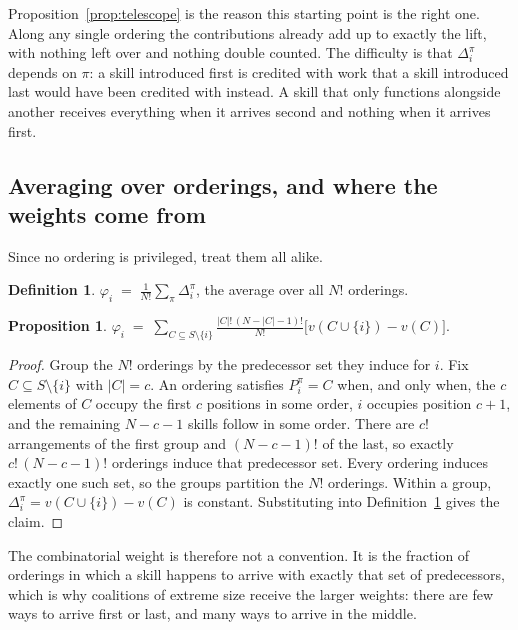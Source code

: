 \documentclass[11pt]{article}
\theoremstyle{plain}
\newtheorem{proposition}[theorem]{Proposition}
\theoremstyle{definition}
\newtheorem{definition}[theorem]{Definition}
\theoremstyle{remark}
\begin{document}
Proposition~\ref{prop:telescope} is the reason this starting point is the right one. Along any single ordering the contributions already add up to exactly the lift, with nothing left over and nothing double counted. The difficulty is that $\Delta_i^\pi$ depends on $\pi$: a skill introduced first is credited with work that a skill introduced last would have been credited with instead. A skill that only functions alongside another receives everything when it arrives second and nothing when it arrives first.

\subsection{Averaging over orderings, and where the weights come from}

Since no ordering is privileged, treat them all alike.

\begin{definition}\label{def:shapley}
$\displaystyle \varphi_i \;=\; \frac{1}{N!}\sum_{\pi} \Delta_i^\pi$, the average over all $N!$ orderings.
\end{definition}

\begin{proposition}\label{prop:weights}
$\displaystyle \varphi_i \;=\; \sum_{C \subseteq S \setminus \{i\}} \frac{|C|!\,(N - |C| - 1)!}{N!}\Big[v(C \cup \{i\}) - v(C)\Big].$
\end{proposition}

\begin{proof}
Group the $N!$ orderings by the predecessor set they induce for $i$. Fix $C \subseteq S \setminus \{i\}$ with $|C| = c$. An ordering satisfies $P_i^\pi = C$ when, and only when, the $c$ elements of $C$ occupy the first $c$ positions in some order, $i$ occupies position $c+1$, and the remaining $N - c - 1$ skills follow in some order. There are $c!$ arrangements of the first group and $(N-c-1)!$ of the last, so exactly $c!\,(N-c-1)!$ orderings induce that predecessor set. Every ordering induces exactly one such set, so the groups partition the $N!$ orderings. Within a group, $\Delta_i^\pi = v(C \cup \{i\}) - v(C)$ is constant. Substituting into Definition~\ref{def:shapley} gives the claim.
\end{proof}

The combinatorial weight is therefore not a convention. It is the fraction of orderings in which a skill happens to arrive with exactly that set of predecessors, which is why coalitions of extreme size receive the larger weights: there are few ways to arrive first or last, and many ways to arrive in the middle.
\end{document}
